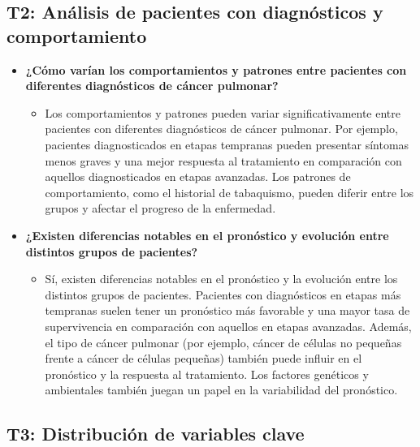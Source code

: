 \documentclass[10pt,journal,compsoc]{IEEEtran}
\begin{document}
\subsection*{T2: Análisis de pacientes con diagnósticos y comportamiento}

\begin{itemize}
    \item \textbf{¿Cómo varían los comportamientos y patrones entre pacientes con diferentes diagnósticos de cáncer pulmonar?}
    \begin{itemize}
        \item Los comportamientos y patrones pueden variar significativamente entre pacientes con diferentes diagnósticos de cáncer pulmonar. Por ejemplo, pacientes diagnosticados en etapas tempranas pueden presentar síntomas menos graves y una mejor respuesta al tratamiento en comparación con aquellos diagnosticados en etapas avanzadas. Los patrones de comportamiento, como el historial de tabaquismo, pueden diferir entre los grupos y afectar el progreso de la enfermedad.
    \end{itemize}

    \item \textbf{¿Existen diferencias notables en el pronóstico y evolución entre distintos grupos de pacientes?}
    \begin{itemize}
        \item Sí, existen diferencias notables en el pronóstico y la evolución entre los distintos grupos de pacientes. Pacientes con diagnósticos en etapas más tempranas suelen tener un pronóstico más favorable y una mayor tasa de supervivencia en comparación con aquellos en etapas avanzadas. Además, el tipo de cáncer pulmonar (por ejemplo, cáncer de células no pequeñas frente a cáncer de células pequeñas) también puede influir en el pronóstico y la respuesta al tratamiento. Los factores genéticos y ambientales también juegan un papel en la variabilidad del pronóstico.
    \end{itemize}
\end{itemize}

\subsection*{T3: Distribución de variables clave}
\end{document}
